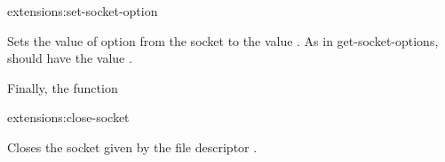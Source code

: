 \begin{defun}{extensions:}{set-socket-option}{%
    }
  
  Sets the value of option  from the socket 
  to the value . As in get-socket-options, 
  should have the value .

\end{defun}

Finally, the function

\begin{defun}{extensions:}{close-socket}{%
    }

  Closes the socket given by the file descriptor .

\end{defun}
